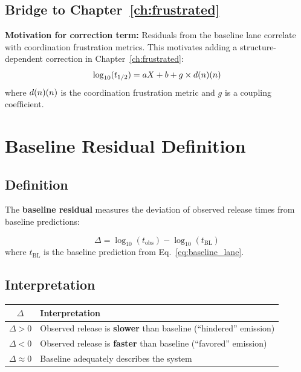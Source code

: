 \subsection{Bridge to Chapter~\ref{ch:frustrated}}

\begin{resultbox}
    \textbf{Motivation for correction term:}
    Residuals from the baseline lane correlate with coordination frustration
    metrics. This motivates adding a structure-dependent correction in
    Chapter~\ref{ch:frustrated}:
    \begin{equation}
        \log_{10}(t_{1/2}) = a X + b + g \times d(n)(n)
        \label{eq:corrected_lane}
    \end{equation}
    where $d(n)(n)$ is the coordination frustration metric and $g$
    is a coupling coefficient.
    \tagP
\end{resultbox}

\section{Baseline Residual Definition}
\label{sec:gn:residual}

\subsection{Definition}

The \textbf{baseline residual} measures the deviation of observed release
times from baseline predictions:

\begin{derivationbox}
    \begin{equation}
        \Delta = \log_{10}(t_{\text{obs}}) - \log_{10}(t_{\text{BL}})
        \label{eq:residual_def}
    \end{equation}
    where $t_{\text{BL}}$ is the baseline prediction from Eq.~\eqref{eq:baseline_lane}.
    \tagBL
\end{derivationbox}

\subsection{Interpretation}

\begin{center}
\begin{tabular}{cp{10cm}}
    \toprule
    $\Delta$ & Interpretation \\
    \midrule
    $\Delta > 0$ & Observed release is \textbf{slower} than baseline
                   (``hindered'' emission) \\
    $\Delta < 0$ & Observed release is \textbf{faster} than baseline
                   (``favored'' emission) \\
    $\Delta \approx 0$ & Baseline adequately describes the system \\
    \bottomrule
\end{tabular}
\end{center}


